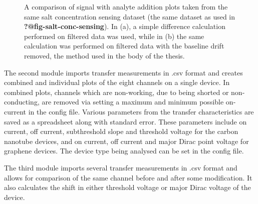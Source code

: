 \documentclass[
  a4paper,
]{scrbook}
\begin{document}
\begin{figure}
\begin{minipage}[t]{0.50\linewidth}
{{}

}

\subcaption{\label{fig-spaa-detrend}}
\end{minipage}%

\caption{\label{fig-spaa-plot-comparison}A comparison of signal with
analyte addition plots taken from the same salt concentration sensing
dataset (the same dataset as used in \textbf{?@fig-salt-conc-sensing}).
In (a), a simple difference calculation performed on filtered data was
used, while in (b) the same calculation was performed on filtered data
with the baseline drift removed, the method used in the body of the
thesis.}

\end{figure}

The second module imports transfer measurements in .csv format and
creates combined and individual plots of the eight channels on a single
device. In combined plots, channels which are non-working, due to being
shorted or non-conducting, are removed via setting a maximum and minimum
possible on-current in the config file. Various parameters from the
transfer characteristics are saved as a spreadsheet along with standard
error. These parameters include on current, off current, subthreshold
slope and threshold voltage for the carbon nanotube devices, and on
current, off current and major Dirac point voltage for graphene devices.
The device type being analysed can be set in the config file.

The third module imports several transfer measurements in .csv format
and allows for comparison of the same channel before and after some
modification. It also calculates the shift in either threshold voltage
or major Dirac voltage of the device.


\backmatter
\printbibliography
\end{document}
